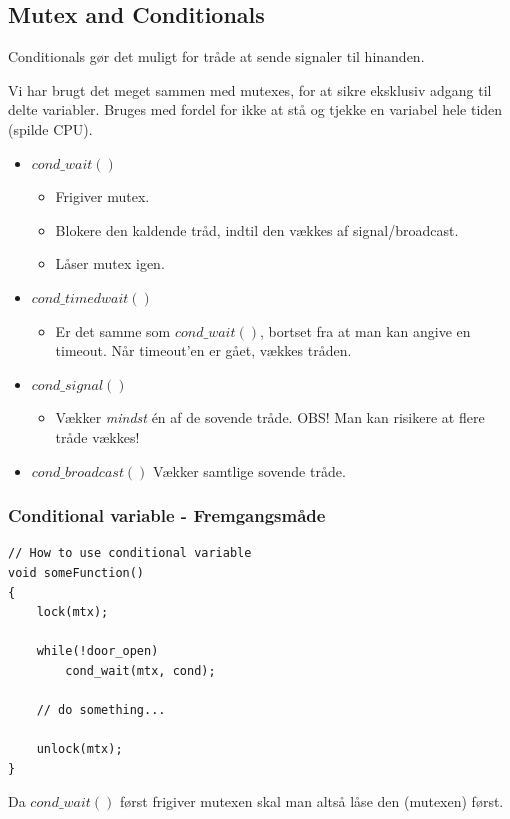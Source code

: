 \subsection{Mutex and Conditionals}
Conditionals gør det muligt for tråde at sende signaler til hinanden.

Vi har brugt det meget sammen med mutexes, for at sikre eksklusiv adgang til delte variabler. Bruges med fordel for ikke at stå og tjekke en variabel hele tiden (spilde CPU).

\begin{itemize}
	\item $cond\_wait()$
	\begin{itemize}
		\item Frigiver mutex.
		\item Blokere den kaldende tråd, indtil den vækkes af signal/broadcast.
		\item Låser mutex igen.
	\end{itemize}
	\item $cond\_timedwait()$
	\begin{itemize}
		\item Er det samme som $cond\_wait()$, bortset fra at man kan angive en timeout. Når timeout'en er gået, vækkes tråden.
	\end{itemize}
	\item $cond\_signal()$
	\begin{itemize}
		\item Vækker \textit{mindst} én af de sovende tråde. OBS! Man kan risikere at flere tråde vækkes!
	\end{itemize}
	\item $cond\_broadcast()$
	Vækker samtlige sovende tråde.
\end{itemize}

\subsubsection{Conditional variable - Fremgangsmåde}

\begin{lstlisting}[otherkeywords={lock, unlock}]
// How to use conditional variable
void someFunction()
{
	lock(mtx);
	
	while(!door_open)
		cond_wait(mtx, cond);
		
	// do something...
	
	unlock(mtx);
}
\end{lstlisting}
Da $cond\_wait()$ først frigiver mutexen skal man altså låse den (mutexen) først.

